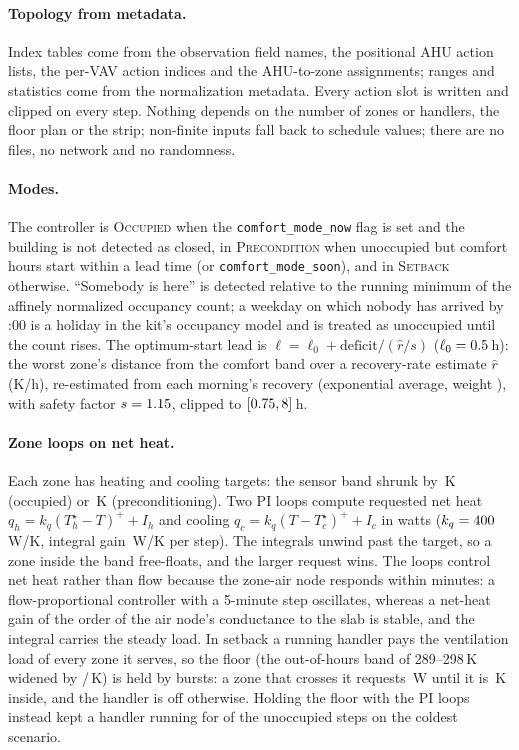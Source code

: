 \documentclass{article}
\begin{document}
\paragraph{Topology from metadata.} Index tables come from the observation field names, the positional AHU action lists, the per-VAV action indices and the AHU-to-zone assignments; ranges and statistics come from the normalization metadata. Every action slot is written and clipped on every step. Nothing depends on the number of zones or handlers, the floor plan or the strip; non-finite inputs fall back to schedule values; there are no files, no network and no randomness.

\paragraph{Modes.} The controller is \textsc{Occupied} when the \texttt{comfort\_mode\_now} flag is set and the building is not detected as closed, in \textsc{Precondition} when unoccupied but comfort hours start within a lead time (or \texttt{comfort\_mode\_soon}), and in \textsc{Setback} otherwise. ``Somebody is here'' is detected relative to the running minimum of the affinely normalized occupancy count; a weekday on which nobody has arrived by \ParHolidayCheckH{}:00 is a holiday in the kit's occupancy model and is treated as unoccupied until the count rises. The optimum-start lead is $\ell = \ell_0 + \text{deficit}/(\hat{r}/s)$ ($\ell_0 = 0.5$\,h): the worst zone's distance from the comfort band over a recovery-rate estimate $\hat{r}$ (K/h), re-estimated from each morning's recovery (exponential average, weight \ParRateEma), with safety factor $s=1.15$, clipped to $[0.75, 8]$\,h.

\paragraph{Zone loops on net heat.} Each zone has heating and cooling targets: the sensor band shrunk by \ParMarginOcc\,K (occupied) or \ParMarginPre\,K (preconditioning). Two PI loops compute requested net heat $q_h = k_q (T_h^\star - T)^+ + I_h$ and cooling $q_c = k_q (T - T_c^\star)^+ + I_c$ in watts ($k_q = 400$\,W/K, integral gain \ParKiWPerKStep\,W/K per step). The integrals unwind past the target, so a zone inside the band free-floats, and the larger request wins. The loops control net heat rather than flow because the zone-air node responds within minutes: a flow-proportional controller with a 5-minute step oscillates, whereas a net-heat gain of the order of the air node's conductance to the slab is stable, and the integral carries the steady load. In setback a running handler pays the ventilation load of every zone it serves, so the floor (the out-of-hours band of 289--298\,K widened by \ParNightLowExt{}/\ParNightHighExt\,K) is held by bursts: a zone that crosses it requests \ParQSbW\,W until it is \ParSbHystK\,K inside, and the handler is off otherwise. Holding the floor with the PI loops instead kept a handler running for \VthreeAhuOnUnocc{} of the unoccupied steps on the coldest scenario.
\end{document}
